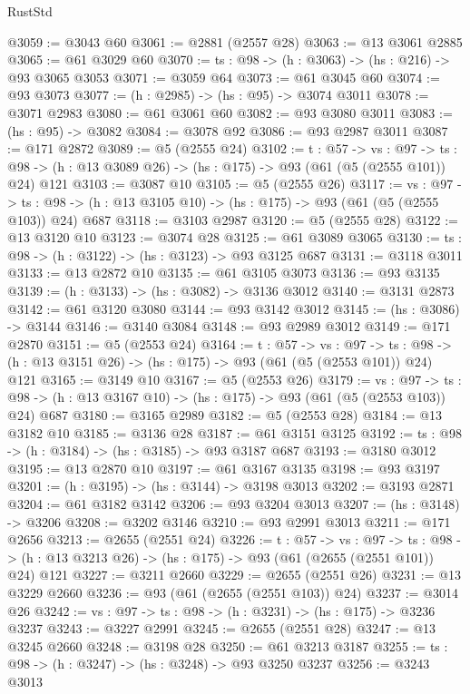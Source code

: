 \begin{lexlean}{RustStd}
\begin{coremodule}
@3059 := @3043 @60
@3061 := @2881 (@2557 @28)
@3063 := @13 @3061 @2885
@3065 := @61 @3029 @60
@3070 := {ts : @98} -> (h : @3063) -> (hs : @216) -> @93 @3065 @3053
@3071 := @3059 @64
@3073 := @61 @3045 @60
@3074 := @93 @3073
@3077 := (h : @2985) -> (hs : @95) -> @3074 @3011
@3078 := @3071 @2983
@3080 := @61 @3061 @60
@3082 := @93 @3080 @3011
@3083 := (hs : @95) -> @3082
@3084 := @3078 @92
@3086 := @93 @2987 @3011
@3087 := @171 @2872
@3089 := @5 (@2555 @24)
@3102 := {t : @57} ->
  {vs : @97} ->
  {ts : @98} -> (h : @13 @3089 @26) -> (hs : @175) -> @93 (@61 (@5 (@2555 @101)) @24) @121
@3103 := @3087 @10
@3105 := @5 (@2555 @26)
@3117 := {vs : @97} ->
  {ts : @98} -> (h : @13 @3105 @10) -> (hs : @175) -> @93 (@61 (@5 (@2555 @103)) @24) @687
@3118 := @3103 @2987
@3120 := @5 (@2555 @28)
@3122 := @13 @3120 @10
@3123 := @3074 @28
@3125 := @61 @3089 @3065
@3130 := {ts : @98} -> (h : @3122) -> (hs : @3123) -> @93 @3125 @687
@3131 := @3118 @3011
@3133 := @13 @2872 @10
@3135 := @61 @3105 @3073
@3136 := @93 @3135
@3139 := (h : @3133) -> (hs : @3082) -> @3136 @3012
@3140 := @3131 @2873
@3142 := @61 @3120 @3080
@3144 := @93 @3142 @3012
@3145 := (hs : @3086) -> @3144
@3146 := @3140 @3084
@3148 := @93 @2989 @3012
@3149 := @171 @2870
@3151 := @5 (@2553 @24)
@3164 := {t : @57} ->
  {vs : @97} ->
  {ts : @98} -> (h : @13 @3151 @26) -> (hs : @175) -> @93 (@61 (@5 (@2553 @101)) @24) @121
@3165 := @3149 @10
@3167 := @5 (@2553 @26)
@3179 := {vs : @97} ->
  {ts : @98} -> (h : @13 @3167 @10) -> (hs : @175) -> @93 (@61 (@5 (@2553 @103)) @24) @687
@3180 := @3165 @2989
@3182 := @5 (@2553 @28)
@3184 := @13 @3182 @10
@3185 := @3136 @28
@3187 := @61 @3151 @3125
@3192 := {ts : @98} -> (h : @3184) -> (hs : @3185) -> @93 @3187 @687
@3193 := @3180 @3012
@3195 := @13 @2870 @10
@3197 := @61 @3167 @3135
@3198 := @93 @3197
@3201 := (h : @3195) -> (hs : @3144) -> @3198 @3013
@3202 := @3193 @2871
@3204 := @61 @3182 @3142
@3206 := @93 @3204 @3013
@3207 := (hs : @3148) -> @3206
@3208 := @3202 @3146
@3210 := @93 @2991 @3013
@3211 := @171 @2656
@3213 := @2655 (@2551 @24)
@3226 := {t : @57} ->
  {vs : @97} ->
  {ts : @98} -> (h : @13 @3213 @26) -> (hs : @175) -> @93 (@61 (@2655 (@2551 @101)) @24) @121
@3227 := @3211 @2660
@3229 := @2655 (@2551 @26)
@3231 := @13 @3229 @2660
@3236 := @93 (@61 (@2655 (@2551 @103)) @24)
@3237 := @3014 @26
@3242 := {vs : @97} -> {ts : @98} -> (h : @3231) -> (hs : @175) -> @3236 @3237
@3243 := @3227 @2991
@3245 := @2655 (@2551 @28)
@3247 := @13 @3245 @2660
@3248 := @3198 @28
@3250 := @61 @3213 @3187
@3255 := {ts : @98} -> (h : @3247) -> (hs : @3248) -> @93 @3250 @3237
@3256 := @3243 @3013

\end{coremodule}
\end{lexlean}
